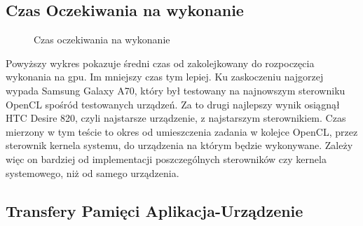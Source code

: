 \subsection[Czas Oczekiwania na wykonanie]{Czas Oczekiwania na wykonanie}

\begin{figure}[H]
\caption{Czas oczekiwania na wykonanie}
\end{figure}

Powyższy wykres pokazuje średni czas od zakolejkowany do rozpoczęcia wykonania na gpu. Im mniejszy czas tym lepiej. Ku zaskoczeniu najgorzej wypada Samsung Galaxy A70, który był testowany na najnowszym sterowniku OpenCL spośród testowanych urządzeń. Za to drugi najlepszy wynik osiągnął HTC Desire 820, czyli najstarsze urządzenie, z najstarszym sterownikiem. Czas mierzony w tym teście to okres od umieszczenia zadania w kolejce OpenCL, przez sterownik kernela systemu, do urządzenia na którym będzie wykonywane. Zależy więc on bardziej od implementacji poszczególnych sterowników czy kernela systemowego, niż od samego urządzenia.

\subsection[Transfery Pamięci Aplikacja-Urządzenie]{Transfery Pamięci Aplikacja-Urządzenie}

